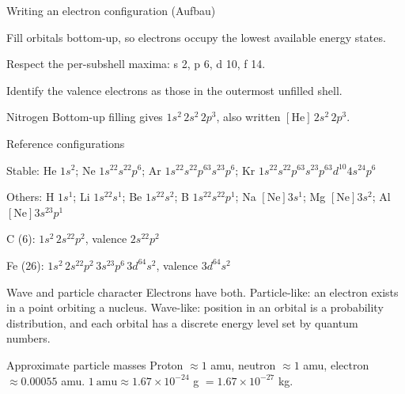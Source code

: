 \documentclass[11pt]{article}
\begin{document}
\begin{method}{Writing an electron configuration (Aufbau)}
\begin{steps}
\item Fill orbitals bottom-up, so electrons occupy the lowest available energy
states.
\item Respect the per-subshell maxima: s 2, p 6, d 10, f 14.
\item Identify the valence electrons as those in the outermost unfilled shell.
\end{steps}
\end{method}

\begin{worked}{Nitrogen}
Bottom-up filling gives $1s^2\,2s^2\,2p^3$, also written
$[\mathrm{He}]\,2s^2\,2p^3$. 
\end{worked}

\begin{keydef}{Reference configurations}
\begin{points}
\item Stable: He $1s^2$; Ne $1s^22s^22p^6$; Ar $1s^22s^22p^63s^23p^6$;
Kr $1s^22s^22p^63s^23p^63d^{10}4s^24p^6$
\item Others: H $1s^1$; Li $1s^22s^1$; Be $1s^22s^2$; B $1s^22s^22p^1$;
Na $[\mathrm{Ne}]3s^1$; Mg $[\mathrm{Ne}]3s^2$; Al $[\mathrm{Ne}]3s^23p^1$
\item C (6): $1s^2\,2s^22p^2$, valence $2s^22p^2$
\item Fe (26): $1s^2\,2s^22p^2\,3s^23p^6\,3d^64s^2$, valence $3d^64s^2$
\end{points}
\end{keydef}

\begin{keydef}{Wave and particle character}
Electrons have both. Particle-like: an electron exists in a point orbiting a
nucleus. Wave-like: position in an orbital is a probability distribution, and
each orbital has a discrete energy level set by quantum numbers.
\end{keydef}


\begin{keydef}{Approximate particle masses}
Proton $\approx 1$ amu, neutron $\approx 1$ amu, electron $\approx 0.00055$ amu.
$1\ \text{amu} \approx 1.67\times10^{-24}$ g $= 1.67\times10^{-27}$ kg.
\end{keydef}
\end{document}
